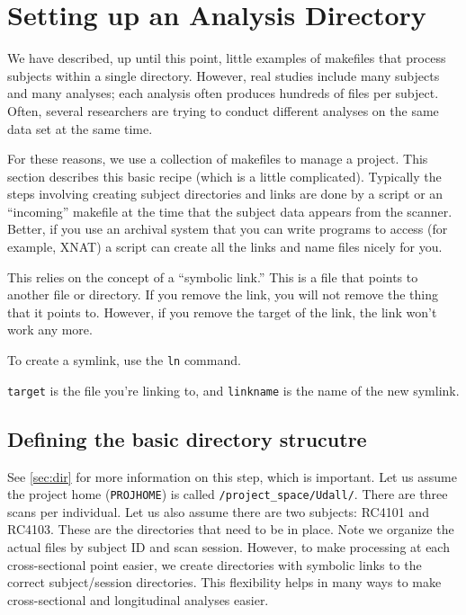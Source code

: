 \section{Setting up an Analysis Directory}
\label{sec:analysisdir}

We have described, up until this point, little examples of makefiles that process subjects within a single directory. However, real studies include many subjects and many analyses; each analysis often produces hundreds of files per subject. Often, several researchers are trying to conduct different analyses on the same data set at the same time.

For these reasons, we use a collection of makefiles to manage a project. This section describes this basic recipe (which is a little complicated). Typically the steps involving creating subject directories and links are done by a script or an ``incoming'' makefile at the time that the subject data appears from the scanner. Better, if you use an archival system that you can write programs to access (for example, XNAT) a script can create all the links and name files nicely for you.

This relies on the concept of a ``symbolic link.'' This is a file that points to another file or directory. If you remove the link, you will not remove the thing that it points to. However, if you remove the target of the link, the link won't work any more.

To create a symlink, use the \texttt{ln} command.

\texttt{target} is the file you're linking to, and \texttt{linkname} is the name of the new symlink.

\subsection{Defining the basic directory strucutre}
See \autoref{sec:dir} for more information on this step, which is important. Let us assume the project home (\texttt{PROJHOME}) is called \texttt{/project_space/Udall/}. There are three scans per individual. Let us also assume there are two subjects: RC4101 and RC4103. These are the directories that need to be in place. Note we organize the actual files by subject ID and scan session. However, to make processing at each cross-sectional point easier, we create directories with symbolic links to the correct subject/session directories. This flexibility helps in many ways to make cross-sectional and longitudinal analyses easier.


